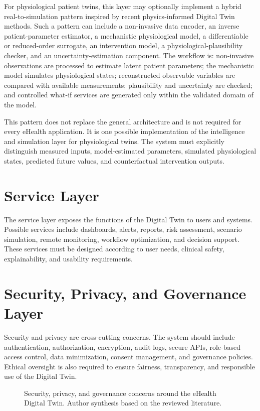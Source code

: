 For physiological patient twins, this layer may optionally implement a hybrid real-to-simulation pattern inspired by recent physics-informed Digital Twin methods. Such a pattern can include a non-invasive data encoder, an inverse patient-parameter estimator, a mechanistic physiological model, a differentiable or reduced-order surrogate, an intervention model, a physiological-plausibility checker, and an uncertainty-estimation component. The workflow is: non-invasive observations are processed to estimate latent patient parameters; the mechanistic model simulates physiological states; reconstructed observable variables are compared with available measurements; plausibility and uncertainty are checked; and controlled what-if services are generated only within the validated domain of the model.

This pattern does not replace the general architecture and is not required for every eHealth application. It is one possible implementation of the intelligence and simulation layer for physiological twins. The system must explicitly distinguish measured inputs, model-estimated parameters, simulated physiological states, predicted future values, and counterfactual intervention outputs.

\section{Service Layer}
The service layer exposes the functions of the Digital Twin to users and systems. Possible services include dashboards, alerts, reports, risk assessment, scenario simulation, remote monitoring, workflow optimization, and decision support. These services must be designed according to user needs, clinical safety, explainability, and usability requirements.

\section{Security, Privacy, and Governance Layer}
Security and privacy are cross-cutting concerns. The system should include authentication, authorization, encryption, audit logs, secure APIs, role-based access control, data minimization, consent management, and governance policies. Ethical oversight is also required to ensure fairness, transparency, and responsible use of the Digital Twin.

\begin{figure}[H]
    \centering
    \resizebox{0.9\textwidth}{!}{}
    \caption{Security, privacy, and governance concerns around the eHealth Digital Twin. Author synthesis based on the reviewed literature.}
    \label{fig:security_privacy}
\end{figure}

